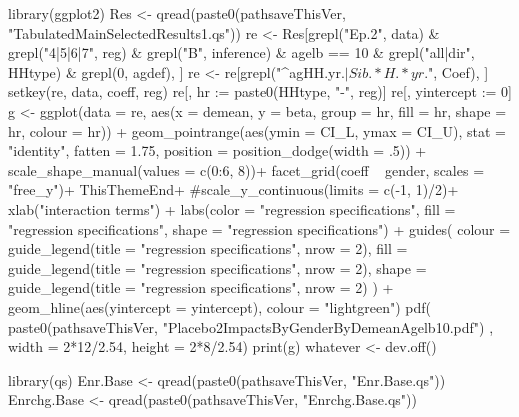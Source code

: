 \begin{Schunk}
\begin{Sinput}
library(ggplot2)
Res <- qread(paste0(pathsaveThisVer, "TabulatedMainSelectedResults1.qs"))
re <- Res[grepl("Ep.2", data) & grepl("4|5|6|7", reg) & grepl("B", inference)
   & agelb == 10 & grepl("all|dir", HHtype) & grepl(0, agdef), ]
re <- re[grepl("^agHH.yr.$|Sib.*H.*yr.$", Coef), ]
setkey(re, data, coeff, reg)
re[, hr := paste0(HHtype, "-", reg)]
re[, yintercept := 0]
g <- ggplot(data = re, 
    aes(x = demean, y = beta, group = hr, fill = hr, shape = hr, colour = hr)) + 
  geom_pointrange(aes(ymin = CI_L, ymax = CI_U),
    stat = "identity", fatten = 1.75, 
    position = position_dodge(width = .5)) +
  scale_shape_manual(values = c(0:6, 8))+
  facet_grid(coeff ~ gender, scales = "free_y")+
  ThisThemeEnd+
  #scale_y_continuous(limits = c(-1, 1)/2)+
  xlab("interaction terms") + 
  labs(color  = "regression specifications", fill = "regression specifications", 
    shape = "regression specifications") +
  guides(
    colour = guide_legend(title = "regression specifications", nrow = 2),
    fill = guide_legend(title = "regression specifications", nrow = 2),
    shape = guide_legend(title = "regression specifications", nrow = 2)
    ) +
  geom_hline(aes(yintercept = yintercept), colour = "lightgreen")
pdf(
  paste0(pathsaveThisVer, "Placebo2ImpactsByGenderByDemeanAgelb10.pdf")
  , width = 2*12/2.54, height = 2*8/2.54)
print(g)
whatever <- dev.off()
\end{Sinput}
\end{Schunk}
\begin{Schunk}
\begin{Sinput}
library(qs)
Enr.Base <- qread(paste0(pathsaveThisVer, "Enr.Base.qs"))
Enrchg.Base <- qread(paste0(pathsaveThisVer, "Enrchg.Base.qs"))
\end{Sinput}
\end{Schunk}
